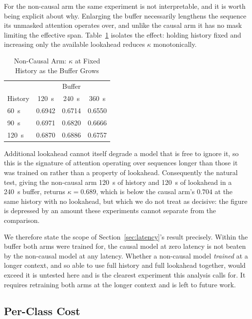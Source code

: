 \documentclass[conference]{IEEEtran}
\begin{document}
For the non-causal arm the same experiment is not interpretable, and it is worth being explicit about why.
Enlarging the buffer necessarily lengthens the sequence its unmasked attention operates over, and unlike
the causal arm it has no mask limiting the effective span. Table~\ref{tab:contamination} isolates the
effect: holding history fixed and increasing only the available lookahead reduces $\kappa$ monotonically.

\begin{table}[t]
\caption{Non-Causal Arm: $\kappa$ at Fixed History as the Buffer Grows}
\label{tab:contamination}
\centering
\begin{tabular}{lccc}
\toprule
 & \multicolumn{3}{c}{Buffer} \\
History & 120~s & 240~s & 360~s \\
\midrule
\hphantom{0}60~s & 0.6942 & 0.6714 & 0.6550 \\
\hphantom{0}90~s & 0.6971 & 0.6820 & 0.6666 \\
120~s            & 0.6870 & 0.6886 & 0.6757 \\
\bottomrule
\end{tabular}
\end{table}

Additional lookahead cannot itself degrade a model that is free to ignore it, so this is the signature of
attention operating over sequences longer than those it was trained on rather than a property of lookahead.
Consequently the natural test, giving the non-causal arm 120~s of history and 120~s of lookahead in a 240~s
buffer, returns $\kappa = 0.689$, which is below the causal arm's $0.704$ at the same history with no
lookahead, but which we do not treat as decisive: the figure is depressed by an amount these experiments
cannot separate from the comparison.

We therefore state the scope of Section~\ref{sec:latency}'s result precisely. Within the buffer both arms
were trained for, the causal model at zero latency is not beaten by the non-causal model at any latency.
Whether a non-causal model \emph{trained} at a longer context, and so able to use full history and full
lookahead together, would exceed it is untested here and is the clearest experiment this analysis calls
for. It requires retraining both arms at the longer context and is left to future work.

\subsection{Per-Class Cost}
\label{sec:perclass}
\end{document}
